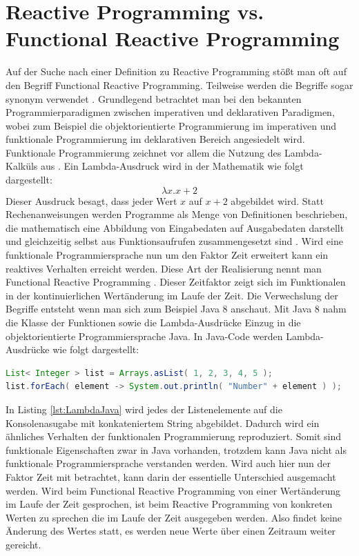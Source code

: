 \section{Reactive Programming vs. Functional Reactive Programming}
Auf der Suche nach einer Definition zu Reactive Programming stößt man oft auf den Begriff Functional Reactive Programming. Teilweise werden die Begriffe sogar synonym verwendet \cite{Nurkiewicz.2017}. Grundlegend betrachtet man bei den bekannten Programmierparadigmen zwischen imperativen und deklarativen Paradigmen, wobei zum Beispiel die objektorientierte Programmierung im imperativen und funktionale Programmierung im deklarativen Bereich angesiedelt wird. Funktionale Programmierung zeichnet vor allem die Nutzung des Lambda-Kalküls aus \cite{lamdakalk}. Ein Lambda-Ausdruck wird in der Mathematik wie folgt dargestellt:
\begin{displaymath}
\lambda x.x+2
\end{displaymath}
Dieser Ausdruck besagt, dass jeder Wert $x$ auf $x+2$ abgebildet wird.
Statt Rechenanweisungen werden Programme als Menge von Definitionen beschrieben, die mathematisch eine Abbildung von Eingabedaten auf Ausgabedaten darstellt und gleichzeitig selbst aus Funktionsaufrufen zusammengesetzt sind \cite{fpwiki}. Wird eine funktionale Programmiersprache nun um den Faktor Zeit erweitert kann ein reaktives Verhalten erreicht werden. Diese Art der Realisierung nennt man Functional Reactive Programming \cite{hsklwiki}. Dieser Zeitfaktor zeigt sich im Funktionalen in der kontinuierlichen Wertänderung im Laufe der Zeit. Die Verwechslung der Begriffe entsteht wenn man sich zum Beispiel Java 8 anschaut. Mit Java 8 nahm die Klasse der Funktionen sowie die Lambda-Ausdrücke Einzug in die objektorientierte Programmiersprache Java. In Java-Code werden Lambda-Ausdrücke wie folgt dargestellt:
\begin{lstlisting}[language=java, caption={Lambda Beispiel in Java}, label=lst:LambdaJava, frame=single]
List< Integer > list = Arrays.asList( 1, 2, 3, 4, 5 );
list.forEach( element -> System.out.println( "Number" + element ) );
\end{lstlisting}
In Listing \ref{lst:LambdaJava} wird jedes der Listenelemente auf die Konsolenasugabe mit konkateniertem String abgebildet. Dadurch wird ein ähnliches Verhalten der funktionalen Programmierung reproduziert. Somit sind funktionale Eigenschaften zwar in Java vorhanden, trotzdem kann Java nicht als funktionale Programmiersprache verstanden werden. Wird auch hier nun der Faktor Zeit mit betrachtet, kann darin der essentielle Unterschied ausgemacht werden. Wird beim Functional Reactive Programming von einer Wertänderung im Laufe der Zeit gesprochen, ist beim Reactive Programming von konkreten Werten zu sprechen die im Laufe der Zeit ausgegeben werden. Also findet keine Änderung des Wertes statt, es werden neue Werte über einen Zeitraum weiter gereicht. 